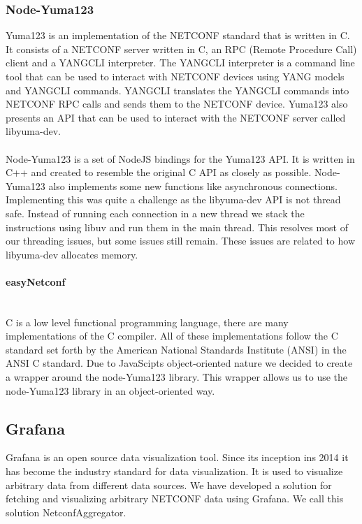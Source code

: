\documentclass[12pt]{article}
\newcommand{\subsubsubsection}[1]{\paragraph{#1}\mbox{}\\}
\begin{document}
\subsubsection{Node-Yuma123}
Yuma123 is an implementation of the NETCONF standard that is written in C.
It consists of a NETCONF server written in C, an RPC (Remote Procedure Call) client 
and a YANGCLI interpreter. The YANGCLI interpreter is a command line tool that can be used to
interact with NETCONF devices using YANG models and YANGCLI commands. YANGCLI
translates the YANGCLI commands into NETCONF RPC calls and sends them to the NETCONF device.
Yuma123 also presents an API that can be used to interact with the NETCONF server called 
libyuma-dev.
\\
\\
Node-Yuma123 is a set of NodeJS bindings for the Yuma123 API. It is written in C++ and created
to resemble the original C API as closely as possible. Node-Yuma123 also implements some 
new functions like asynchronous connections. Implementing this was quite a challenge as the 
libyuma-dev API is not thread safe. Instead of running each connection in a new thread we
stack the instructions using libuv \cite{libuv} and run them in the main thread. This 
resolves most of our threading issues, but some issues still remain. 
These issues are related to how libyuma-dev allocates memory.


\subsubsubsection{easyNetconf}
C is a low level functional programming language, there are many implementations of the C compiler.
All of these implementations follow the C standard set forth by the American National Standards Institute 
(ANSI) in the ANSI C standard. Due to JavaScipts object-oriented nature we decided to create 
a wrapper around the node-Yuma123 library. This wrapper allows us to use the node-Yuma123
library in an object-oriented way.

\subsection{Grafana}
Grafana is an open source data visualization tool. Since its inception ins 2014 it has become the industry standard
for data visualization. It is used to visualize arbitrary data from different data sources.
We have developed a solution for fetching and visualizing arbitrary NETCONF data using Grafana.
We call this solution NetconfAggregator.
\end{document}
